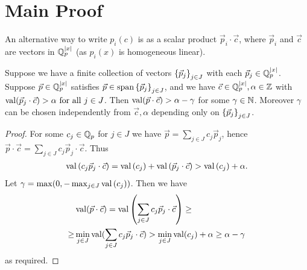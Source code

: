 
\section{Main Proof}


An alternative way to write $p_i(c)$ is as a scalar product $\vec p_i \cdot \vec c$,
where $\vec p_i$ and $\vec c$ are vectors in $\mathbb{Q}_p^{|x|}$ (as $p_i(x)$ is homogeneous linear).

\begin{Lemma}	 
  Suppose we have a finite collection of vectors $\left\{\vec p_j\right\}_{j \in J}$ with each $\vec p_j \in \mathbb{Q}_p^{|x|}$.
  Suppose $\vec p \in \mathbb{Q}_p^{|x|}$ satisfies $\vec p \in \operatorname{span} \left\{\vec p_j\right\}_{j \in J}$,
  and we have $\vec c \in \mathbb{Q}_p^{|x|}, \alpha \in \mathbb{Z}$ with $\operatorname{val}(\vec p_j \cdot \vec c) > \alpha \text{ for all } j \in J$.
  Then $\operatorname{val}(\vec p \cdot \vec c) > \alpha - \gamma$ for some $\gamma \in \mathbb{N}$.
  Moreover $\gamma$ can be chosen independently from $\vec c, \alpha$ depending only on $\left\{\vec p_j\right\}_{j \in J}$.
\end{Lemma}

\begin{proof}
  For some $c_j \in \mathbb{Q}_p$ for $j \in J$ we have $\vec p = \sum_{j \in J} c_j \vec p_j$,
  hence $\vec p \cdot \vec c = \sum_{j \in J} c_j \vec p_j \cdot \vec c$.
  Thus
  \begin{align*}
    \operatorname{val} \left(c_j \vec p_j \cdot \vec c\right) = \operatorname{val} \left(c_j\right) + \operatorname{val} \left(\vec p_j \cdot \vec c\right) > \operatorname{val} \left(c_j\right) + \alpha.
  \end{align*}
  Let $\gamma = \max(0, -\max_{j \in J} \operatorname{val} \left(c_j\right))$.
  Then we have 
  \begin{align*}
    &\operatorname{val}(\vec p \cdot \vec c) =
      \operatorname{val} \left(\sum_{j \in J} c_j \vec p_j \cdot \vec c\right) \geq \\
      \geq &\min_{j \in J} \operatorname{val}(\sum_{j \in J} c_j \vec p_j \cdot \vec c) >
      \min_{j \in J} \operatorname{val}(c_j) + \alpha \geq
      \alpha - \gamma
  \end{align*}
  as required.
\end{proof}


